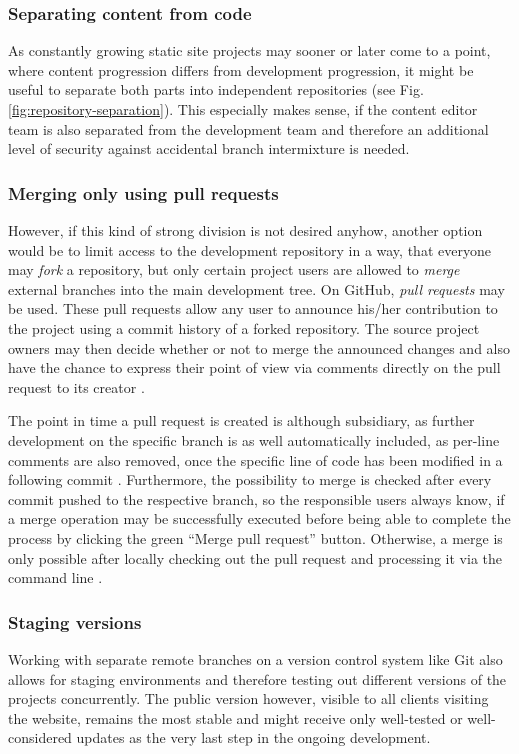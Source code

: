 \subsubsection{Separating content from code}
As constantly growing static site projects may sooner or later come to a point, where content progression differs from development progression, it might be useful to separate both parts into independent repositories (see Fig. \ref{fig:repository-separation}). This especially makes sense, if the content editor team is also separated from the development team and therefore an additional level of security against accidental branch intermixture is needed.

\subsubsection{Merging only using pull requests}
However, if this kind of strong division is not desired anyhow, another option would be to limit access to the development repository in a way, that everyone may \emph{fork} a repository, but only certain project users are allowed to \emph{merge} external branches into the main development tree. On GitHub, \emph{pull requests} may be used. These pull requests allow any user to announce his/her contribution to the project using a commit history of a forked repository. The source project owners may then decide whether or not to merge the announced changes and also have the chance to express their point of view via comments directly on the pull request to its creator \cite[p. 394f]{loeliger2012version}.

The point in time a pull request is created is although subsidiary, as further development on the specific branch is as well automatically included, as per-line comments are also removed, once the specific line of code has been modified in a following commit \cite{GithubPullRequests}. Furthermore, the possibility to merge is checked after every commit pushed to the respective branch, so the responsible users always know, if a merge operation may be successfully executed before being able to complete the process by clicking the green ``Merge pull request'' button. Otherwise, a merge is only possible after locally checking out the pull request and processing it via the command line \cite{GithubMergePullRequests}.

\subsubsection{Staging versions}
Working with separate remote branches on a version control system like Git also allows for staging environments and therefore testing out different versions of the projects concurrently. The public version however, visible to all clients visiting the website, remains the most stable and might receive only well-tested or well-considered updates as the very last step in the ongoing development.


